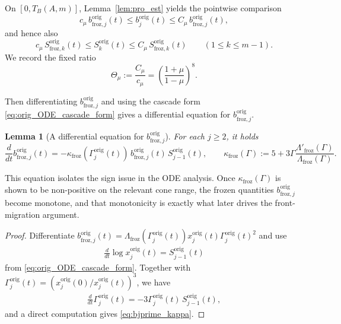 \documentclass[reqno,11pt]{amsart}
\newtheorem{lemma}[theorem]{Lemma}
\begin{document}
On $[0,T_B(A,m)]$, Lemma~\ref{lem:pro_est} yields the pointwise comparison
\begin{equation}
\label{eq:bj_compare_boot}
c_\mu\,b_{\mathrm{froz},j}^{\mathrm{orig}}(t)
\le 
b_j^{\mathrm{orig}}(t)
\le
C_\mu\,b_{\mathrm{froz},j}^{\mathrm{orig}}(t),
\end{equation}
and hence also
\begin{equation}
\label{eq:Sk_compare_boot}
c_\mu\,S_{\mathrm{froz},k}^{\mathrm{orig}}(t)
\le
S_k^{\mathrm{orig}}(t)
\le
C_\mu\,S_{\mathrm{froz},k}^{\mathrm{orig}}(t)
\qquad (1\le k\le m-1).
\end{equation}
We record the fixed ratio
\begin{equation}
\label{eq:def_Theta_mu}
\Theta_\mu:=\frac{C_\mu}{c_\mu}=\left( \frac{1+\mu}{1-\mu} \right)^8.
\end{equation}

Then differentiating $b_{\mathrm{froz},j}^{\mathrm{orig}}$ and using the cascade form \eqref{eq:orig_ODE_cascade_form} gives a differential equation for $b_{\mathrm{froz},j}^{\mathrm{orig}}$.

\begin{lemma}[A differential equation for $b_{\mathrm{froz},j}^{\mathrm{orig}}$]
 For each $j\ge 2$, it holds
\begin{equation}
\label{eq:bjprime_kappa}
\frac{d}{dt}b_{\mathrm{froz},j}^{\mathrm{orig}}(t)
=-\kappa_{\mathrm{froz}}(\Gamma_j^{\mathrm{orig}}(t))\,b_{\mathrm{froz},j}^{\mathrm{orig}}(t)\,
S_{j-1}^{\mathrm{orig}}(t),
\qquad
\kappa_{\mathrm{froz}}(\Gamma):=5+3\Gamma\frac{\Lambda'_{\mathrm{froz}}(\Gamma)}{\Lambda_{\mathrm{froz}}(\Gamma)}.
\end{equation}
\end{lemma}

This equation isolates the sign issue in the ODE analysis. Once $\kappa_{\mathrm{froz}}(\Gamma)$ is shown to be non-positive on the relevant cone range, the frozen quantities $b_{\mathrm{froz},j}^{\mathrm{orig}}$ become monotone, and that monotonicity is exactly what later drives the front-migration argument.

\begin{proof}
Differentiate $b_{\mathrm{froz},j}^{\mathrm{orig}}(t)=\Lambda_{\mathrm{froz}}(\Gamma_j^{\mathrm{orig}}(t))x_j^{\mathrm{orig}}(t)\Gamma_j^{\mathrm{orig}}(t)^2$ and use
\begin{align*}
\frac{d}{dt}\log x_j^{\mathrm{orig}}(t)=S_{j-1}^{\mathrm{orig}}(t)
\end{align*}
from \eqref{eq:orig_ODE_cascade_form}.
Together with $\Gamma_j^{\mathrm{orig}}(t)=(x_j^{\mathrm{orig}}(0)/x_j^{\mathrm{orig}}(t))^3$, we have
\begin{align*}
\frac{d}{dt}\Gamma_j^{\mathrm{orig}}(t)=-3\Gamma_j^{\mathrm{orig}}(t)\,S_{j-1}^{\mathrm{orig}}(t),
\end{align*}
and a direct computation gives
\eqref{eq:bjprime_kappa}.
\end{proof}
\end{document}
